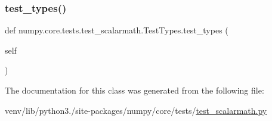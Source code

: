 \subsubsection{\texorpdfstring{test\+\_\+types()}{test\_types()}}
{\footnotesize\ttfamily def numpy.\+core.\+tests.\+test\+\_\+scalarmath.\+Test\+Types.\+test\+\_\+types (\begin{DoxyParamCaption}\item[{}]{self }\end{DoxyParamCaption})}



The documentation for this class was generated from the following file\+:\begin{DoxyCompactItemize}
\item 
venv/lib/python3./site-\/packages/numpy/core/tests/\hyperlink{test__scalarmath_8py}{test\+\_\+scalarmath.\+py}\end{DoxyCompactItemize}
